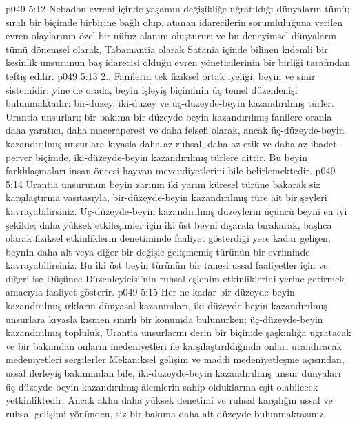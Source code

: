 \vs p049 5:12 Nebadon evreni içinde yaşamın değişikliğe uğratıldığı dünyaların tümü; sıralı bir biçimde birbirine bağlı olup, atanan idarecilerin sorumluluğuna verilen evren olaylarının özel bir nüfuz alanını oluşturur; ve bu deneyimsel dünyaların tümü dönemsel olarak, Tabamantia olarak Satania içinde bilinen kıdemli bir kesinlik unsurunun baş idarecisi olduğu evren yöneticilerinin bir birliği tarafından teftiş edilir.
\vs p049 5:13 2.. Fanilerin tek fiziksel ortak iyeliği, beyin ve sinir sistemidir; yine de orada, beyin işleyiş biçiminin üç temel düzenlenişi bulunmaktadır: bir\hyp{}düzey, iki\hyp{}düzey ve üç\hyp{}düzeyde\hyp{}beyin kazandırılmış türler. Urantia unsurları; bir bakıma bir\hyp{}düzeyde\hyp{}beyin kazandırılmış fanilere oranla daha yaratıcı, daha maceraperest ve daha felsefi olarak, ancak üç\hyp{}düzeyde\hyp{}beyin kazandırılmış unsurlara kıyasla daha az ruhsal, daha az etik ve daha az ibadet\hyp{}perver biçimde, iki\hyp{}düzeyde\hyp{}beyin kazandırılmış türlere aittir. Bu beyin farklılaşmaları insan öncesi hayvan mevcudiyetlerini bile belirlemektedir.
\vs p049 5:14 Urantia unsurunun beyin zarının iki yarım küresel türüne bakarak siz karşılaştırma vasıtasıyla, bir\hyp{}düzeyde\hyp{}beyin kazandırılmış türe ait bir şeyleri kavrayabilirsiniz. Üç\hyp{}düzeyde\hyp{}beyin kazandırılmış düzeylerin üçüncü beyni en iyi şekilde; daha yüksek etkileşimler için iki üst beyni dışarıda bırakarak, başlıca olarak fiziksel etkinliklerin denetiminde faaliyet gösterdiği yere kadar gelişen, beynin daha alt veya diğer bir değişle gelişmemiş türünün bir evriminde kavrayabilirsiniz. Bu iki üst beyin türünün bir tanesi ussal faaliyetler için ve diğeri ise Düşünce Düzenleyicisi’nin ruhsal\hyp{}eşlenim etkinliklerini yerine getirmek amacıyla faaliyet gösterir.
\vs p049 5:15 Her ne kadar bir\hyp{}düzeyde\hyp{}beyin kazandırılmış ırkların dünyasal kazanımları, iki\hyp{}düzeyde\hyp{}beyin kazandırılmış unsurlara kıyasla kısmen sınırlı bir konumda bulunurken; üç\hyp{}düzeyde\hyp{}beyin kazandırılmış topluluk, Urantia unsurlarını derin bir biçimde şaşkınlığa uğratacak ve bir bakımdan onların medeniyetleri ile karşılaştırıldığında onları utandıracak medeniyetleri sergilerler Mekaniksel gelişim ve maddi medeniyetleşme açısından, ussal ilerleyiş bakımından bile, iki\hyp{}düzeyde\hyp{}beyin kazandırılmış unsur dünyaları üç\hyp{}düzeyde\hyp{}beyin kazandırılmış âlemlerin sahip olduklarına eşit olabilecek yetkinliktedir. Ancak aklın daha yüksek denetimi ve ruhsal karşılığın ussal ve ruhsal gelişimi yönünden, siz bir bakıma daha alt düzeyde bulunmaktasınız.
